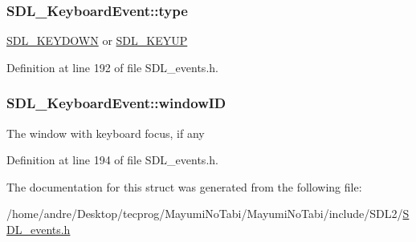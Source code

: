 \hypertarget{struct_s_d_l___keyboard_event_ae0b2f2aace6f80c1f47e5a14350d409a}{
\subsubsection[{type}]{ S\-D\-L\-\_\-\-Keyboard\-Event\-::type}}\label{struct_s_d_l___keyboard_event_ae0b2f2aace6f80c1f47e5a14350d409a}
\hyperlink{_s_d_l__events_8h_a3b589e89be6b35c02e0dd34a55f3fccaacaf8cfd53c985cdbf6a90c811d51a1fc}{S\-D\-L\-\_\-\-K\-E\-Y\-D\-O\-W\-N} or \hyperlink{_s_d_l__events_8h_a3b589e89be6b35c02e0dd34a55f3fccaadefb8866b9d28be21c2c33c35cc66c4b}{S\-D\-L\-\_\-\-K\-E\-Y\-U\-P} 

Definition at line 192 of file S\-D\-L\-\_\-events.\-h.

\hypertarget{struct_s_d_l___keyboard_event_a56efb6780b96acd5b50d8f797efb3546}{
\subsubsection[{window\-I\-D}]{ S\-D\-L\-\_\-\-Keyboard\-Event\-::window\-I\-D}}\label{struct_s_d_l___keyboard_event_a56efb6780b96acd5b50d8f797efb3546}
The window with keyboard focus, if any 

Definition at line 194 of file S\-D\-L\-\_\-events.\-h.



The documentation for this struct was generated from the following file\-:\begin{DoxyCompactItemize}
\item 
/home/andre/\-Desktop/tecprog/\-Mayumi\-No\-Tabi/\-Mayumi\-No\-Tabi/include/\-S\-D\-L2/\hyperlink{_s_d_l__events_8h}{S\-D\-L\-\_\-events.\-h}\end{DoxyCompactItemize}
